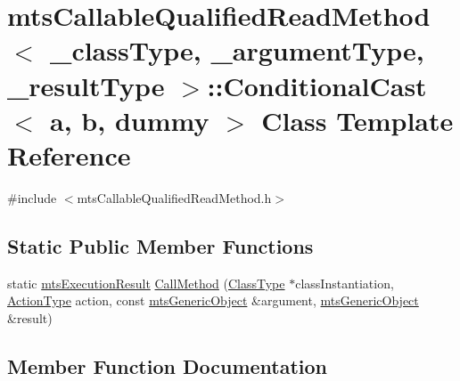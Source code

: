 \hypertarget{classmts_callable_qualified_read_method_1_1_conditional_cast}{}\section{mts\+Callable\+Qualified\+Read\+Method$<$ \+\_\+class\+Type, \+\_\+argument\+Type, \+\_\+result\+Type $>$\+:\+:Conditional\+Cast$<$ a, b, dummy $>$ Class Template Reference}
\label{classmts_callable_qualified_read_method_1_1_conditional_cast}


{\ttfamily \#include $<$mts\+Callable\+Qualified\+Read\+Method.\+h$>$}

\subsection*{Static Public Member Functions}
\begin{DoxyCompactItemize}
\item 
static \hyperlink{classmts_execution_result}{mts\+Execution\+Result} \hyperlink{classmts_callable_qualified_read_method_1_1_conditional_cast_a98e546fb629e8337761e8c5fde591b51}{Call\+Method} (\hyperlink{classmts_callable_qualified_read_method_a6cfee5c3c3c49c691c2f5176ea79d735}{Class\+Type} $\ast$class\+Instantiation, \hyperlink{classmts_callable_qualified_read_method_a6327de6d1017295be394178d8e03b121}{Action\+Type} action, const \hyperlink{classmts_generic_object}{mts\+Generic\+Object} \&argument, \hyperlink{classmts_generic_object}{mts\+Generic\+Object} \&result)
\end{DoxyCompactItemize}


\subsection{Member Function Documentation}
\hypertarget{classmts_callable_qualified_read_method_1_1_conditional_cast_a98e546fb629e8337761e8c5fde591b51}{}
